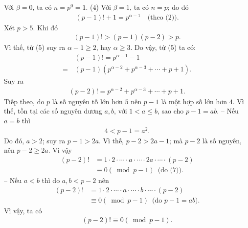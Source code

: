\begin{multicols}{2}
	Với $\beta= 0$, ta có $n = p^0 = 1$. \hfill ($4$)
	\vskip 0.05cm
	Với $\beta = 1$, ta có $n = p$; do đó
	\begin{align*}
		\left( {p - 1} \right)! + 1 = {p^{\alpha  - 1}}	\quad\text{(theo ($2$))}. \tag{$5$}
	\end{align*}                                                      
	Xét $p > 5$. Khi đó
	\begin{align*}
		\left( {p - 1} \right)! > \left( {p - 1} \right)\left( {p - 2} \right) > p.
	\end{align*}
	Vì thế, từ ($5$) suy ra $\alpha -1\ge 2$, hay $\alpha \ge 3$. Do vậy, từ ($5$) ta có:
	\begin{align*}
		&\left( {p - 1} \right)! = {p^{\alpha  - 1}} - 1 \\
		=\, &\left( {p - 1} \right)\left( {{p^{\alpha  - 2}} + {p^{\alpha  - 3}} +  \cdots  + p + 1} \right).
	\end{align*}
	Suy ra
	\begin{align*}
		\left( {p \!-\! 2} \right)! \!=\! {p^{\alpha  \!-\! 2}} \!+\! {p^{\alpha  \!-\! 3}} \!+\!  \cdots  \!+\! p \!+\! 1. \tag{$6$}
	\end{align*}
	Tiếp theo, do $p$ là số nguyên tố lớn hơn $5$ nên $p - 1$ là một hợp số lớn hơn $4$. Vì thế, tồn tại các số nguyên dương $a, b$, với $1 < a \le b$, sao cho $p - 1 = ab$.
	\vskip 0.05cm
	-- Nếu $a = b$ thì
	\begin{align*}
		4 < p - 1 = {a^2}. \tag{$7$}
	\end{align*}
	Do đó, $a > 2$; suy ra $p - 1 > 2a$. Vì thế, $p - 2 > 2a - 1$; mà $p - 2$ là số nguyên, nên $p - 2 \ge 2a$. Vì vậy
	\begin{align*}
	\left( {p - 2} \right)! &= 1 \cdot 2 \cdot  \cdots  \cdot a \cdot  \cdots  \cdot 2a \cdot  \cdots  \cdot \left( {p - 2} \right) \\
	&\equiv 0\left(\!\! {\bmod p - 1} \right)	\,\,\,\text{(do ($7$))}.
	\end{align*}
	-- Nếu $a < b$ thì do $a, b < p - 2$ nên
	\begin{align*}
		\left( {p - 2} \right)! &= 1 \cdot 2 \cdot  \cdots  \cdot a \cdot  \cdots  \cdot b \cdot  \cdots  \cdot \left( {p - 2} \right) \\
		&\equiv 0\left(\!\! {\bmod p - 1} \right) \,\,\,\text{(do $p - 1 = ab$).}
	\end{align*}
	Vì vậy, ta có
	\begin{align*}
		\left( {p - 2} \right)! \equiv 0\left( {\bmod p - 1} \right). \tag{$8$}
	\end{align*}

\end{multicols}
